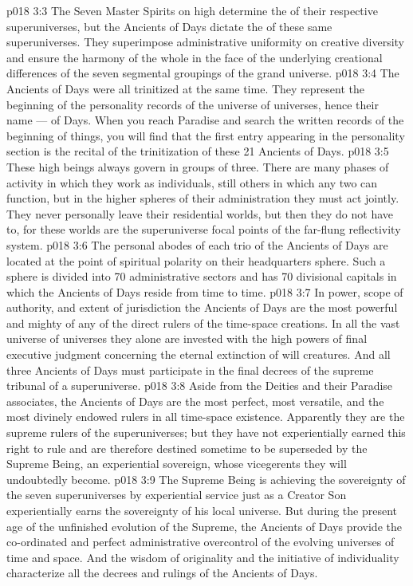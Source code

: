 \vs p018 3:3 The Seven Master Spirits on high determine the  of their respective superuniverses, but the Ancients of Days dictate the  of these same superuniverses. They superimpose administrative uniformity on creative diversity and ensure the harmony of the whole in the face of the underlying creational differences of the seven segmental groupings of the grand universe.
\vs p018 3:4 \pc The Ancients of Days were all trinitized at the same time. They represent the beginning of the personality records of the universe of universes, hence their name ---  of Days. When you reach Paradise and search the written records of the beginning of things, you will find that the first entry appearing in the personality section is the recital of the trinitization of these 21 Ancients of Days.
\vs p018 3:5 \pc These high beings always govern in groups of three. There are many phases of activity in which they work as individuals, still others in which any two can function, but in the higher spheres of their administration they must act jointly. They never personally leave their residential worlds, but then they do not have to, for these worlds are the superuniverse focal points of the far\hyp{}flung reflectivity system.
\vs p018 3:6 The personal abodes of each trio of the Ancients of Days are located at the point of spiritual polarity on their headquarters sphere. Such a sphere is divided into 70 administrative sectors and has 70 divisional capitals in which the Ancients of Days reside from time to time.
\vs p018 3:7 In power, scope of authority, and extent of jurisdiction the Ancients of Days are the most powerful and mighty of any of the direct rulers of the time\hyp{}space creations. In all the vast universe of universes they alone are invested with the high powers of final executive judgment concerning the eternal extinction of will creatures. And all three Ancients of Days must participate in the final decrees of the supreme tribunal of a superuniverse.
\vs p018 3:8 \pc Aside from the Deities and their Paradise associates, the Ancients of Days are the most perfect, most versatile, and the most divinely endowed rulers in all time\hyp{}space existence. Apparently they are the supreme rulers of the superuniverses; but they have not experientially earned this right to rule and are therefore destined sometime to be superseded by the Supreme Being, an experiential sovereign, whose vicegerents they will undoubtedly become.
\vs p018 3:9 The Supreme Being is achieving the sovereignty of the seven superuniverses by experiential service just as a Creator Son experientially earns the sovereignty of his local universe. But during the present age of the unfinished evolution of the Supreme, the Ancients of Days provide the co\hyp{}ordinated and perfect administrative overcontrol of the evolving universes of time and space. And the wisdom of originality and the initiative of individuality characterize all the decrees and rulings of the Ancients of Days.
